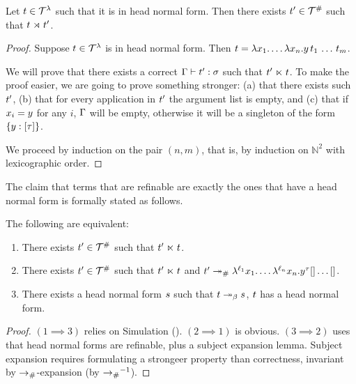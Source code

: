 \begin{lemma}
Let $t \in \mathcal{T}^{\lambda}$ such that it is in head normal form.
 Then there exists $t' \in \mathcal{T}^{\mathtt{\#}}$ such that $t \mathrel{\rtimes} t'$.
\end{lemma}
\begin{proof}
Suppose $t \in \mathcal{T}^{\lambda}$ is in head normal form.
Then $t = \lambda x_1. \hdots\lambda x_n. y\,t_1\,\hdots\,t_m$.

We will prove that there exists a correct $\Gamma \vdash t' : \sigma$ such that $t' \mathrel{\ltimes} t$.
To make the proof easier, we are going to prove something stronger:
  (a) that there exists such $t'$,
  (b) that for every application in $t'$ the argument list is empty, and
  (c) that if $x_i = y$ for any $i$, $\Gamma$ will be empty,
      otherwise it will be a singleton of the form $\{y : [\tau]\}$.

We proceed by induction on the pair $(n, m)$, that is, by induction on
  $\mathbb{N}^2$ with lexicographic order.
\end{proof}

The claim that terms that are refinable are exactly the ones that have
a head normal form is formally stated as follows.


\begin{proposition}
The following are equivalent:
\begin{enumerate}
  \item There exists $t' \in \mathcal{T}^{\mathtt{\#}}$ such that $t' \mathrel{\ltimes} t$.
  \item There exists $t' \in \mathcal{T}^{\mathtt{\#}}$ such that $t' \mathrel{\ltimes} t$
    and $t' \mathrel{\mathrel{\twoheadrightarrow}_{\mathtt{\#}}}
         \lambda^{\ell_1} x_1. \hdots \lambda^{\ell_n} x_n. y^\tau{[] \hdots []}$.
  \item There exists a head normal form $s$ such that $t \mathrel{\twoheadrightarrow}_\beta s$, \ie
    $t$ has a head normal form.
\end{enumerate}
\end{proposition}
\begin{proof}
$(1 \implies 3)$ relies on Simulation ().
$(2 \implies 1)$ is obvious.
$(3 \implies 2)$ uses that head normal forms are refinable, plus a subject expansion lemma.
Subject expansion requires formulating a strongeer property than correctness,
invariant by $\mathrel{\to_{\mathtt{\#}}}$-expansion (\ie by $\mathrel{\to_{\mathtt{\#}}}^{-1}$).
\end{proof}



